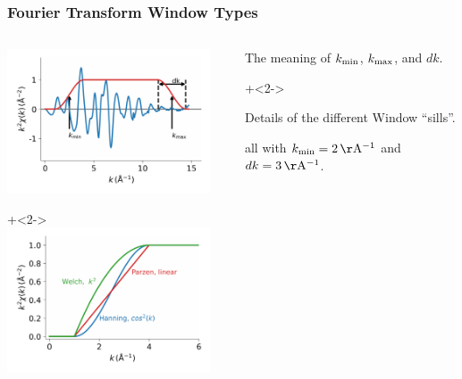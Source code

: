 \begin{frame} \frametitle{Fourier Transform Window Types}
\begin{cenpage}{130mm}

  \begin{columns}

    \begin{column}{70mm}
      \includegraphics[width=60mm]{figs/reduction/ftwin_anat}

      \vmm
      {\onslide+<2-> {
          \includegraphics[width=60mm]{figs/reduction/ftwin_sills}
        }}

    \end{column}

    \begin{column}{55mm}

        \vspace{0.5mm}

      The meaning of $k_{\rm min}$, $k_{\rm max}$, and $dk$.

      \vspace{10mm}


      {\onslide+<2-> {


      \vspace{0.5mm}

      Details of the different Window ``sills''.

      all with $k_{\rm  min}=2\rm\,\AA^{-1}$  and $dk=3\rm\,\AA^{-1} $.

      \vspace{3mm}
    }}
    \end{column}
  \end{columns}

\end{cenpage}
\end{frame}

